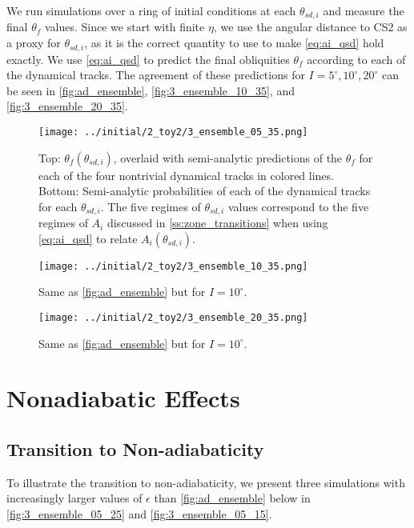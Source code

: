 \documentclass[
        fleqn,
        usenatbib,
    ]{mnras}
\newcommand*{\p}[1]{\left(#1\right)}
\begin{document}
We run simulations over a ring of initial conditions at each $\theta_{sd, i}$
and measure the final $\theta_{f}$ values. Since we start with finite $\eta$, we
use the angular distance to CS2 as a proxy for $\theta_{sd, i}$, as it is the
correct quantity to use to make \autoref{eq:ai_qsd} hold exactly. We use
\autoref{eq:ai_qsd} to predict the final obliquities $\theta_f$ according to
each of the dynamical tracks. The agreement of these predictions for $I =
5^\circ, 10^\circ, 20^\circ$ can be seen in \autoref{fig:ad_ensemble},
\autoref{fig:3_ensemble_10_35}, and \autoref{fig:3_ensemble_20_35}.
\begin{figure}
    \centering
    \texttt{[image: ../initial/2\_toy2/3\_ensemble\_05\_35.png]}
    \caption{Top: $\theta_{f}\p{\theta_{sd, i}}$, overlaid with semi-analytic
    predictions of the $\theta_{ f}$ for each of the four nontrivial
    dynamical tracks in colored lines. Bottom: Semi-analytic probabilities of
    each of the dynamical tracks for each $\theta_{sd, i}$. The five regimes of
    $\theta_{sd, i}$ values correspond to the five regimes of $A_i$ discussed in
    \autoref{ss:zone_transitions} when using \autoref{eq:ai_qsd} to relate
    $A_i\p{\theta_{sd, i}}$. }\label{fig:ad_ensemble}
\end{figure}
\begin{figure}
    \centering
    \texttt{[image: ../initial/2\_toy2/3\_ensemble\_10\_35.png]}
    \caption{Same as \autoref{fig:ad_ensemble} but for $I =
    10^\circ$.}\label{fig:3_ensemble_10_35}
\end{figure}
\begin{figure}
    \texttt{[image: ../initial/2\_toy2/3\_ensemble\_20\_35.png]}
    \caption{Same as \autoref{fig:ad_ensemble} but for $I =
    10^\circ$.}\label{fig:3_ensemble_20_35}
\end{figure}

\section{Nonadiabatic Effects}\label{s:nonad}

\subsection{Transition to Non-adiabaticity}

To illustrate the transition to non-adiabaticity, we present three simulations
with increasingly larger values of $\epsilon$ than \autoref{fig:ad_ensemble}
below in \autoref{fig:3_ensemble_05_25} and \autoref{fig:3_ensemble_05_15}.
\end{document}

